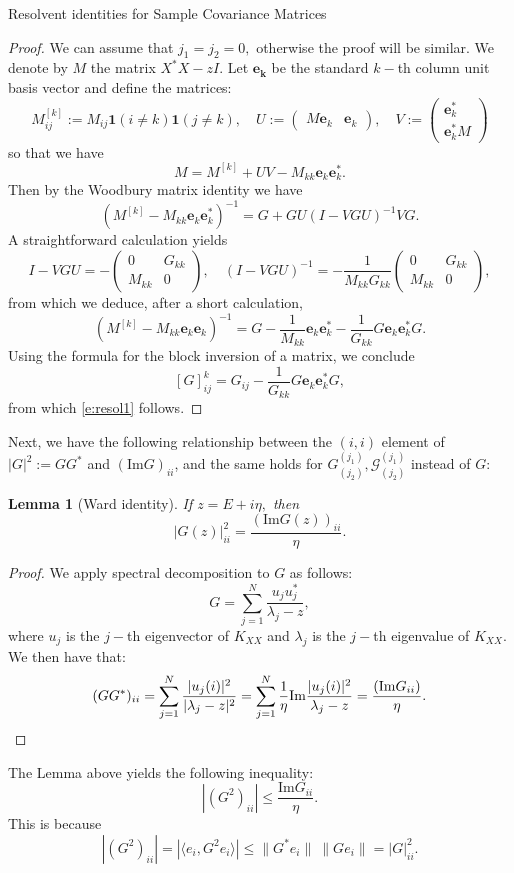 \documentclass[11pt, a4paper, oneside]{book}
\numberwithin{equation}{chapter}
\newcommand{\beq}{\begin{equation}}
\newcommand{\eeq}{\end{equation}}
\newtheorem{lem}[thm]{Lemma}
\begin{document}
\begin{section}{Resolvent identities for Sample Covariance Matrices}
\begin{proof}
    We can assume that $j_1=j_2=0,$ otherwise the proof will be similar. We denote by $M$ the matrix $X^*X - zI$. Let $\mathbf{e_k}$ be the standard $k-$th column unit basis vector and define the matrices:
    \[
M_{ij}^{[k]}:=M_{ij} \mathbf{1}(i \neq k) \mathbf{1}(j \neq k), \quad U:= \begin{pmatrix}
M \mathbf{e}_k & \mathbf{e}_k
\end{pmatrix} , \quad V:= \begin{pmatrix}
\mathbf{e}_k^* \\
\mathbf{e}_k^* M
\end{pmatrix}
\]
so that we have
\[
M=M^{[k]}+U V-M_{k k} \mathbf{e}_k \mathbf{e}_k^* .
\]
Then by the Woodbury matrix identity we have
\[
\left(M^{[k]}-M_{k k} \mathbf{e}_k \mathbf{e}_k^* \right)^{-1}=G+G U(I-V G U)^{-1} V G .
\]
A straightforward calculation yields
\[
I-V G U=-\left(\begin{array}{cc}
0 & G_{k k} \\
M_{k k} & 0
\end{array}\right), \quad(I-V G U)^{-1}=-\frac{1}{M_{k k} G_{k k}}\left(\begin{array}{cc}
0 & G_{k k} \\
M_{k k} & 0
\end{array}\right),
\]
from which we deduce, after a short calculation,
\[
\left(M^{[k]}-M_{k k} \mathbf{e}_k \mathbf{e}_k\right)^{-1}=G-\frac{1}{M_{k k}} \mathbf{e}_k \mathbf{e}_k^*-\frac{1}{G_{k k}} G \mathbf{e}_k \mathbf{e}_k^* G .
\]
Using the formula for the block inversion of a matrix, we conclude
\[
[G]^k_{ij} = G_{ij} -\frac{1}{G_{k k}} G \mathbf{e}_k \mathbf{e}_k^* G,
\]
from which \eqref{e:resol1} follows.
\end{proof}
%
Next, we have the following relationship between the $(i,i)$ element of $|G|^2 := GG^*$ and $(\mathrm{Im} G)_{ii}$, and the same holds for $G^{(j_1)}_{(j_2)}, \mathcal{G}^{(j_1)}_{(j_2)}$ instead of $G$:
%
\begin{lem}[Ward identity] \label{ward} If $z=E+i\eta,$ then
\beq
|G(z)|_{ii}^2 = \frac{(\mathrm{Im} G(z))_{ii}}{\eta}.
\eeq
\end{lem}
%
\begin{proof}
    We apply spectral decomposition to $G$ as follows:
    \[
    G = \sum \limits_{j=1}^N \frac{u_j u_j^*}{\lambda_j - z},
    \]
    where $u_j$ is the $j-$th eigenvector of $K_{XX}$ and $\lambda_j$ is the $j-$th eigenvalue of $K_{XX}.$ We then have that:
    \begin{equation*}
    (GG^*)_{ii} = \sum \limits_{j=1}^N \frac{|u_j(i)|^2}{|\lambda_j-z|^2} = \sum \limits_{j=1}^N \frac{1}{\eta} \mathrm{Im} \frac{|u_j(i)|^2}{\lambda_j - z} = \frac{(\mathrm{Im} G_{ii})}{\eta} . \qedhere
    \end{equation*}
\end{proof}
%
The Lemma above yields the following inequality:
\begin{equation}\label{e:GsImG2}
|(G^2)_{ii}|\leq \frac{\mathrm{Im} G_{ii}}{\eta}.
\end{equation}
%
This is because
\[
|(G^2)_{ii}| = |\langle e_i , G^2 e_i \rangle| \leq \|G^* e_i \| \ \| G e_i \| = |G|^2_{ii}.
\]


\end{section}
\end{document}

